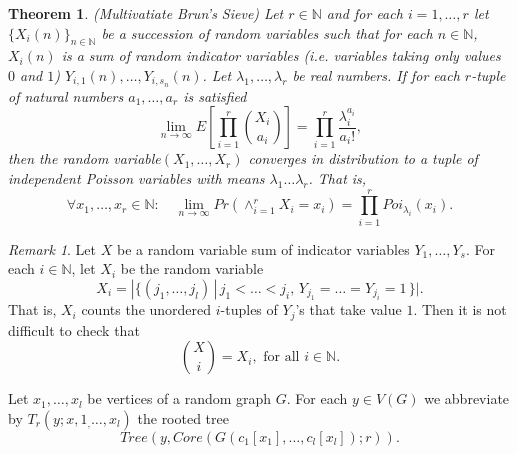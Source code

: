 \documentclass[11pt,notitlepage]{report}
\newtheorem{theorem}{Theorem}[chapter]
\theoremstyle{definition}
\theoremstyle{remark}
\newtheorem{remark}{Remark}[chapter]
\newcommand{\N}{\mathbb{N}}
\newcommand{\Ln}{\lim\limits_{n\to \infty}}
\begin{document}
\begin{theorem}{(Multivatiate Brun's Sieve)}
	Let $r\in \N$ and for each $i=1,\dots, r$  let
	$\{X_i(n)\}_{n\in \N}$ be a succession of random variables 
	such that for each $n\in \N$, $X_i(n)$ 
	is a sum of random indicator variables (i.e. variables 
	taking only values $0$ and $1$)
	$Y_{i,1}(n),\dots, Y_{i,s_n}(n)$. Let $\lambda_1, \dots ,
	\lambda_r$ be real numbers. If for each 
	$r$-tuple of natural numbers $a_1,\dots, a_r$
	is satisfied
	\[ \Ln E\left[\prod_{i=1}^r \binom{X_i}{a_i} \right] = 
	\prod_{i=1}^r \frac{\lambda_i^{a_i}}{a_i!}, \]
	then the random variable$(X_1,\dots ,X_r)$ converges in distribution
	to a tuple of independent Poisson variables with means $\lambda_1
	\dots \lambda_r$. That is,	
	\[ \forall x_1,\dots, x_r\in \N: \quad \Ln Pr(\wedge_{i=1}^r
	 X_i=x_i)= \prod_{i=1}^r Poi_{\lambda_i}(x_i).\]

\end{theorem}

\begin{remark}
	Let $X$ be a random variable sum of indicator variables
	$Y_1, \dots, Y_s$. For each $i\in \N$, let 
	$X_i$ be the random variable
	\[X_i= |\{ (j_1,\dots, j_l)\, | \, j_1<\dots<j_i, \, Y_{j_1}=
	\dots = Y_{j_i}=1 \, \}|.\]
	That is, $X_i$ counts the unordered $i$-tuples of $Y_j$'s that 
	take value $1$. Then it is not difficult to check that
	\[ \binom{X}{i}= X_i, \text{ for all } i\in \N. \] 
\end{remark}

Let $x_1, \dots, x_l$ be vertices of a random graph $G$.
For each $y\in V(G)$ we abbreviate by $T_r(y; x,1_,\dots, x_l)$
the rooted tree 
\[Tree(y, Core(G(c_1[x_1],\dots, c_l[x_l]);r)).\]
\end{document}
